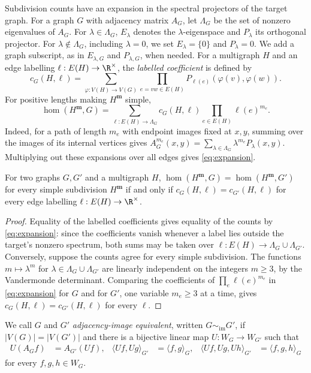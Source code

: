 Subdivision counts have an expansion in the spectral projectors of the target graph.
For a graph $G$ with adjacency matrix $A_G$, let $\Lambda_G$ be the set of
nonzero eigenvalues of $A_G$.
For $\lambda\in\Lambda_G$, $E_\lambda$ denotes the
$\lambda$-eigenspace and $P_\lambda$ its orthogonal projector.
For $\lambda\notin\Lambda_G$, including $\lambda=0$, we set
$E_\lambda=\{0\}$ and $P_\lambda=0$.
We add a graph subscript, as in $E_{\lambda,G}$ and $P_{\lambda,G}$,
when needed. For a multigraph $H$ and an edge labelling
$\ell:E(H)\to\R^\times$, the \emph{labelled coefficient} is
defined by
\begin{equation}\label{eq:contraction}
 c_G(H,\ell)=\sum_{\varphi:V(H)\to V(G)}
    \prod_{e=vw\in E(H)}P_{\ell(e)}(\varphi(v),\varphi(w)).
\end{equation}
For positive lengths making $H^{\mathbf m}$ simple,
\begin{equation}\label{eq:expansion}
 \hom(H^{\mathbf m},G)=\sum_{\ell:E(H)\to\Lambda_G}
       c_G(H,\ell)\prod_{e\in E(H)}\ell(e)^{m_e}.
\end{equation}
Indeed, for a path of length $m_e$ with endpoint images fixed at $x,y$,
summing over the images of its internal vertices gives
$A_G^{m_e}(x,y)=\sum_{\lambda\in\Lambda_G}\lambda^{m_e}P_\lambda(x,y)$.
Multiplying out these expansions over all edges gives \cref{eq:expansion}.
\begin{lemma}\label{lem:subdivision-coefficients}
For two graphs $G,G'$ and a multigraph $H$,
$\hom(H^{\mathbf m},G)=\hom(H^{\mathbf m},G')$ for every simple
subdivision $H^{\mathbf m}$ if and only if $c_G(H,\ell)=c_{G'}(H,\ell)$
for every edge labelling $\ell:E(H)\to\R^\times$.
\end{lemma}
\begin{proof}
Equality of the labelled coefficients gives equality of the counts by
\cref{eq:expansion}: since the coefficients vanish whenever a label
lies outside the target's nonzero spectrum, both sums may be taken over
$\ell:E(H)\to\Lambda_G\cup\Lambda_{G'}$.
Conversely, suppose the counts agree for every simple subdivision.
The functions $m\mapsto\lambda^m$ for
$\lambda\in\Lambda_G\cup\Lambda_{G'}$ are linearly independent on the
integers $m\geq3$, by the Vandermonde determinant.
Comparing the coefficients of $\prod_e\ell(e)^{m_e}$ in
\cref{eq:expansion} for $G$ and for $G'$, one variable $m_e\geq3$ at a time,
gives
$c_G(H,\ell)=c_{G'}(H,\ell)$ for every $\ell$.
\end{proof}

We call $G$ and $G'$ \emph{adjacency-image equivalent}, written
$G\sim_{\mathrm{im}}G'$, if $|V(G)|=|V(G')|$ and
there is a bijective linear map $U:W_G\to W_{G'}$ such that
\begin{equation}\label{eq:adjacency-image-equivalence}
 \begin{aligned}
 U(A_Gf)&=A_{G'}(Uf), &
 \langle Uf,Ug\rangle_{G'}&=\langle f,g\rangle_G, &
 \langle Uf,Ug,Uh\rangle_{G'}&=\langle f,g,h\rangle_G
 \end{aligned}
\end{equation}
for every $f,g,h\in W_G$.

